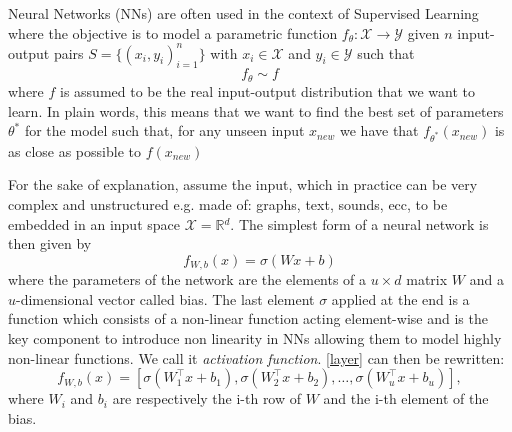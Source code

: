 \documentclass[LaM,binding=0.6cm]{./packages/sapthesis/sapthesis}
\begin{document}
            Neural Networks (NNs) are often used in the context of Supervised Learning where the objective is to model a parametric function 
            $ f_{\theta} \colon \mathcal{X} \to \mathcal{Y}$ given $n$ input-output pairs $S = \{(x_i, y_i)_{i=1}^n\} $ with $x_i \in \mathcal{X}$ and $ y_i \in \mathcal{Y}$
            such that
            \begin{equation}
                f_{\theta} \sim f  
            \end{equation}
            where $f$ is assumed to be the real input-output distribution that we want to learn. In plain words, this means that we want to find the best set of parameters $\theta^{*}$ for the model
            such that, for any unseen input $x_{new}$ we have that $f_{\theta^*}\left(x_{new}\right)$ is as close as possible to $f\left(x_{new}\right)$

            For the sake of explanation, assume the input, which in practice can be very complex and unstructured e.g. made of: graphs, text, sounds, ecc, to be embedded in an input space  $\mathcal{X} = \mathbb{R}{^d}$.
            The simplest form of a neural network is then given by
            \begin{equation}
                \label{layer}
                f_{W, b}\left(x\right) = \sigma(Wx + b)
            \end{equation}
            where the parameters of the network are the elements of a $u \times d$ matrix $ W $ and a $u$-dimensional vector called bias. The last element $ \sigma $ applied at the end is a
            function which consists of a non-linear function acting element-wise and is the key component to introduce non linearity in NNs allowing them to model 
            highly non-linear functions. We call it \textit{activation function}. \ref{layer} can then be rewritten:
            \begin{equation}
                f_{W, b}\left(x\right) = \left[\sigma(W_1^{\intercal} x + b_1), \sigma(W_2^{\intercal} x + b_2), \ldots, \sigma(W_u^{\intercal} x + b_u)\right],
            \end{equation}
            where $W_i$ and $b_i$ are respectively the i-th row of $W$ and the i-th element of the bias.
            
\end{document}
